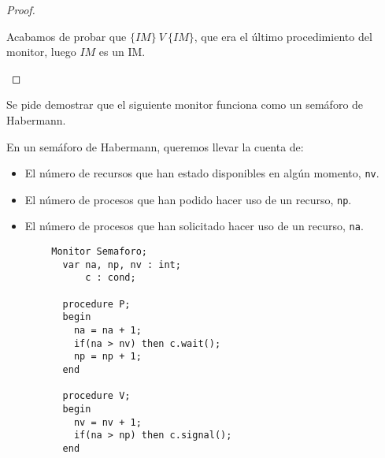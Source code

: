 \begin{ejemplo}
\begin{proof}
\begin{enumerate}
                Acabamos de probar que $\{IM\}\ V\ \{IM\}$, que era el último procedimiento del monitor, luego $IM$ es un IM.
        \end{enumerate}
    \end{proof}
\end{ejemplo}

\begin{ejercicio}
    Se pide demostrar que el siguiente monitor funciona como un semáforo de Habermann.

    En un semáforo de Habermann, queremos llevar la cuenta de:
    \begin{itemize}
        \item El número de recursos que han estado disponibles en algún momento, \verb|nv|.
        \item El número de procesos que han podido hacer uso de un recurso, \verb|np|.
        \item El número de procesos que han solicitado hacer uso de un recurso, \verb|na|.
    \end{itemize}
    \begin{verbatim}
        Monitor Semaforo;
          var na, np, nv : int;
              c : cond;

          procedure P;
          begin
            na = na + 1;
            if(na > nv) then c.wait();
            np = np + 1;
          end

          procedure V;
          begin
            nv = nv + 1;
            if(na > np) then c.signal();
          end


\end{verbatim}
\end{ejercicio}
